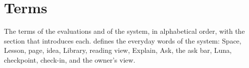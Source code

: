 \chapter{Terms}
\label{app:glossary}

The terms of the evaluations and of the system, in alphabetical order, with
the section that introduces each.  defines the everyday
words of the system: Space, Lesson, page, idea, Library, reading view,
Explain, Ask, the ask bar, Luna, checkpoint, check-in, and the owner's view.

